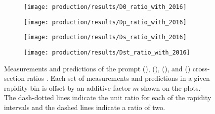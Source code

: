 \begin{figure}
  \begin{subfigure}[b]{0.5\textwidth}
    \centering
    \texttt{[image: production/results/D0\_ratio\_with\_2016]}
    \caption{\PDzero}
    \label{fig:prod:results:ratio_5tev:D0}
  \end{subfigure}
  \begin{subfigure}[b]{0.5\textwidth}
    \centering
    \texttt{[image: production/results/Dp\_ratio\_with\_2016]}
    \caption{\PDplus}
    \label{fig:prod:results:ratio_5tev:Dp}
  \end{subfigure}
  \begin{subfigure}[b]{0.5\textwidth}
    \centering
    \texttt{[image: production/results/Ds\_ratio\_with\_2016]}
    \caption{\PDsplus}
    \label{fig:prod:results:ratio_5tev:Ds}
  \end{subfigure}
  \begin{subfigure}[b]{0.5\textwidth}
    \centering
    \texttt{[image: production/results/Dst\_ratio\_with\_2016]}
    \caption{\PDstarp}
    \label{fig:prod:results:ratio_5tev:Dst}
  \end{subfigure}
  \caption{%
    Measurements and predictions of the prompt \PDzero
    (), \PDplus
    (), \PDsplus
    (), and \PDstarp
    () cross-section ratios
    .
    Each set of measurements and predictions in a given rapidity bin is offset
    by an additive factor $m$ shown on the plots.
    The dash-dotted lines indicate the unit ratio for each of the rapidity
    intervals and the dashed lines indicate a ratio of two.
  }
  \label{fig:prod:results:ratio_5tev}
\end{figure}
